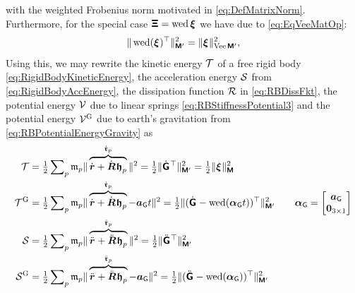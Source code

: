 with the weighted Frobenius norm motivated in \eqref{eq:DefMatrixNorm}.
Furthermore, for the special case $\protoXi = \wedOp \bodyVel{}{}$ we have due to \eqref{eq:EqVeeMatOp}:
\begin{align}
 \norm[\bodyInertiaMatp{}{}]{\wedOp(\bodyVel{}{})^\top}^2 = \norm[\veeMatOp\bodyInertiaMatp{}{}]{\bodyVel{}{}}^2,
\end{align}
Using this, we may rewrite the kinetic energy $\mathcal{T}$ of a free rigid body \eqref{eq:RigidBodyKineticEnergy}, the acceleration energy $\mathcal{S}$ from \eqref{eq:RigidBodyAccEnergy}, the dissipation function $\mathcal{R}$ in \eqref{eq:RBDissFkt}, the potential energy $\mathcal{V}$ due to linear springs \eqref{eq:RBStiffnessPotential3} and the potential energy $\mathcal{V}^{\mathrm{G}}$ due to earth's gravitation from \eqref{eq:RBPotentialEnergyGravity} as
\begin{subequations}
\begin{align}
 \kineticEnergy
 &= \tfrac{1}{2} \sumParticles \particleMass{\PidxI} \norm{\overbrace{\rd + \bodyRotd{}{}{}{} \particleBodyPos{\PidxI}}^{\particlePosd{\PidxI}}}^2
 = \tfrac{1}{2} \norm[\bodyInertiaMatp{}{}]{\bodyHomoCoordd{}{}^\top}^2
 = \tfrac{1}{2} \norm[\bodyInertiaMat{}{}]{\bodyVel{}{}}^2
\\
 \kineticEnergyInertial
 &= \tfrac{1}{2} \sumParticles \particleMass{\PidxI} \norm{\overbrace{\rd + \bodyRotd{}{}{}{} \particleBodyPos{\PidxI}}^{\particlePosd{\PidxI}} - \gravityAcc t}^2
 = \tfrac{1}{2} \norm[\bodyInertiaMatp{}{}]{(\bodyHomoCoordd{}{} - \wedOp(\gravityAccWrench t))^\top}^2
\qquad
 \gravityAccWrench = \begin{bmatrix} \gravityAcc \\ \tuple{0}_{3\times1} \end{bmatrix}
\\
 \label{eq:RBAccEnergyHomo}
 \accEnergy 
 &= \tfrac{1}{2} \sumParticles \particleMass{\PidxI} \norm{\overbrace{\bodyPosdd{}{}{} + \bodyRotdd{}{}{}{} \particleBodyPos{\PidxI}}^{\particlePosdd{\PidxI}}}^2
 = \tfrac{1}{2} \norm[\bodyInertiaMatp{}{}]{\bodyHomoCoorddd{}{}^\top}^2
\\
 \accEnergyInertial 
 &= \tfrac{1}{2} \sumParticles \particleMass{\PidxI} \norm{\overbrace{\bodyPosdd{}{}{} + \bodyRotdd{}{}{}{} \particleBodyPos{\PidxI}}^{\particlePosdd{\PidxI}} - \gravityAcc}^2
 = \tfrac{1}{2} \norm[\bodyInertiaMatp{}{}]{(\bodyHomoCoorddd{}{} - \wedOp(\gravityAccWrench))^\top}^2
\\

\end{align}
\end{subequations}
